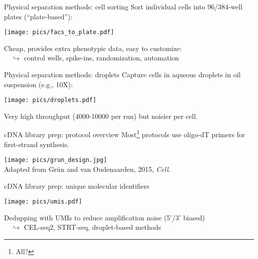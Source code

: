 \documentclass{beamer}
\begin{document}
\begin{frame}{Physical separation methods: cell sorting}
Sort individual cells into 96/384-well plates (``plate-based''):

\begin{center}
\texttt{[image: pics/facs\_to\_plate.pdf]}
\end{center}

Cheap, provides extra phenotypic data, easy to customize:\\
$\quad\hookrightarrow$ control wells, spike-ins, randomization, automation
\end{frame}

\begin{frame}{Physical separation methods: droplets}
Capture cells in aqueous droplets in oil suspension (e.g., 10X):

\begin{center}
\texttt{[image: pics/droplets.pdf]}
\end{center}

Very high throughput (4000-10000 per run) but noisier per cell.
\end{frame}

\begin{frame}{cDNA library prep: protocol overview}
Most\footnote{All?} protocols use oligo-dT primers for first-strand synthesis.
\begin{center}
\texttt{[image: pics/grun\_design.jpg]} \\
{\tiny Adapted from Gr\"un and van Oudenaarden, 2015, \emph{Cell}.}
\end{center}
\end{frame}

\begin{frame}{cDNA library prep: unique molecular identifiers}
\begin{center}
\texttt{[image: pics/umis.pdf]}
\end{center}

Dedupping with UMIs to reduce amplification noise (5'/3' biased)\\
$\quad\hookrightarrow$ CEL-seq2, STRT-seq, droplet-based methods
\end{frame}
\end{document}
